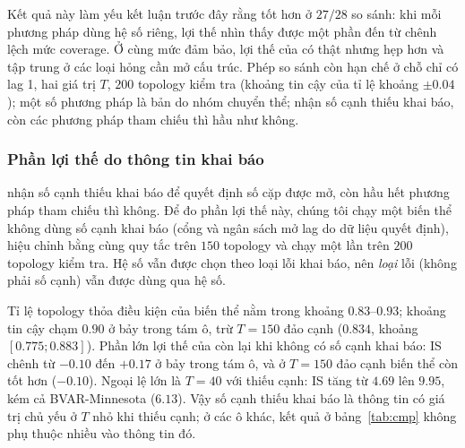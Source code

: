 Kết quả này làm yếu kết luận trước đây rằng \ours{} tốt hơn ở $27/28$ so sánh: khi mỗi phương pháp dùng hệ số riêng, lợi thế nhìn thấy được một phần đến từ chênh lệch mức coverage. Ở cùng mức đảm bảo, lợi thế của \ours{} có thật nhưng hẹp hơn và tập trung ở các loại hỏng cần mở cấu trúc. Phép so sánh còn hạn chế ở chỗ chỉ có lag 1, hai giá trị $T$, $200$ topology kiểm tra (khoảng tin cậy của tỉ lệ khoảng $\pm0.04$); một số phương pháp là bản do nhóm chuyển thể; \ours{} nhận số cạnh thiếu khai báo, còn các phương pháp tham chiếu thì hầu như không.

\subsubsection*{Phần lợi thế do thông tin khai báo}
\ours{} nhận số cạnh thiếu khai báo để quyết định số cặp được mở, còn hầu hết phương pháp tham chiếu thì không. Để đo phần lợi thế này, chúng tôi chạy một biến thể không dùng số cạnh khai báo (cổng và ngân sách mở lag do dữ liệu quyết định), hiệu chỉnh bằng cùng quy tắc trên $150$ topology và chạy một lần trên $200$ topology kiểm tra. Hệ số vẫn được chọn theo loại lỗi khai báo, nên \emph{loại} lỗi (không phải số cạnh) vẫn được dùng qua hệ số.

\begin{table}[H]
\centering\footnotesize
\setlength{\tabcolsep}{2.5pt}

\caption{Biến thể không dùng số cạnh khai báo ở cùng mức đảm bảo (lag 1). Hiệu là IS của biến thể trừ IS của phương pháp so sánh, kèm khoảng tin cậy bootstrap theo topology; dương nghĩa là biến thể kém hơn.}\label{tab:auto}
\end{table}

Tỉ lệ topology thỏa điều kiện của biến thể nằm trong khoảng $0.83$--$0.93$; khoảng tin cậy chạm $0.90$ ở bảy trong tám ô, trừ $T=150$ đảo cạnh ($0.834$, khoảng $[0.775;0.883]$). Phần lớn lợi thế của \ours{} còn lại khi không có số cạnh khai báo: IS chênh từ $-0.10$ đến $+0.17$ ở bảy trong tám ô, và ở $T=150$ đảo cạnh biến thể còn tốt hơn ($-0.10$). Ngoại lệ lớn là $T=40$ với thiếu cạnh: IS tăng từ $4.69$ lên $9.95$, kém cả BVAR-Minnesota ($6.13$). Vậy số cạnh thiếu khai báo là thông tin có giá trị chủ yếu ở $T$ nhỏ khi thiếu cạnh; ở các ô khác, kết quả ở bảng~\ref{tab:cmp} không phụ thuộc nhiều vào thông tin đó.


